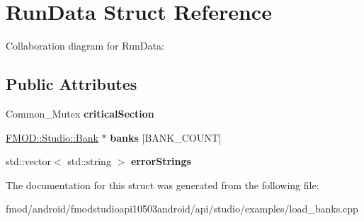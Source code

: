 \hypertarget{struct_run_data}{\section{Run\+Data Struct Reference}
\label{struct_run_data}
}


Collaboration diagram for Run\+Data\+:
\subsection*{Public Attributes}
\begin{DoxyCompactItemize}
\item 
\hypertarget{struct_run_data_a116616befab6f46567dffaeaef2b8ee2}{Common\+\_\+\+Mutex {\bfseries critical\+Section}}\label{struct_run_data_a116616befab6f46567dffaeaef2b8ee2}

\item 
\hypertarget{struct_run_data_aa943b00de7a3dcc2348a882edf0f8575}{\hyperlink{class_f_m_o_d_1_1_studio_1_1_bank}{F\+M\+O\+D\+::\+Studio\+::\+Bank} $\ast$ {\bfseries banks} \mbox{[}B\+A\+N\+K\+\_\+\+C\+O\+U\+N\+T\mbox{]}}\label{struct_run_data_aa943b00de7a3dcc2348a882edf0f8575}

\item 
\hypertarget{struct_run_data_aacbbdab92449a78e606f03fdb408f34e}{std\+::vector$<$ std\+::string $>$ {\bfseries error\+Strings}}\label{struct_run_data_aacbbdab92449a78e606f03fdb408f34e}

\end{DoxyCompactItemize}


The documentation for this struct was generated from the following file\+:\begin{DoxyCompactItemize}
\item 
fmod/android/fmodstudioapi10503android/api/studio/examples/load\+\_\+banks.\+cpp\end{DoxyCompactItemize}
